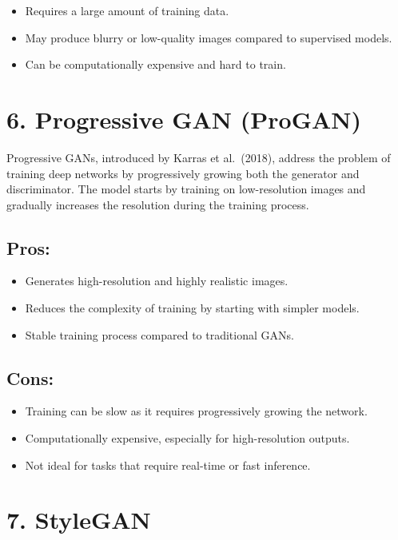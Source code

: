 \documentclass[
]{book}
\providecommand{\tightlist}{%
  \setlength{\itemsep}{0pt}\setlength{\parskip}{0pt}}
\begin{document}
\begin{itemize}
\tightlist
\item
  Requires a large amount of training data.
\item
  May produce blurry or low-quality images compared to supervised models.
\item
  Can be computationally expensive and hard to train.
\end{itemize}

\section{6. Progressive GAN (ProGAN)}\label{progressive-gan-progan}

Progressive GANs, introduced by Karras et al.~(2018), address the problem of training deep networks by progressively growing both the generator and discriminator. The model starts by training on low-resolution images and gradually increases the resolution during the training process.

\subsection{Pros:}\label{pros-5}

\begin{itemize}
\tightlist
\item
  Generates high-resolution and highly realistic images.
\item
  Reduces the complexity of training by starting with simpler models.
\item
  Stable training process compared to traditional GANs.
\end{itemize}

\subsection{Cons:}\label{cons-5}

\begin{itemize}
\tightlist
\item
  Training can be slow as it requires progressively growing the network.
\item
  Computationally expensive, especially for high-resolution outputs.
\item
  Not ideal for tasks that require real-time or fast inference.
\end{itemize}

\section{7. StyleGAN}\label{stylegan}
\end{document}
